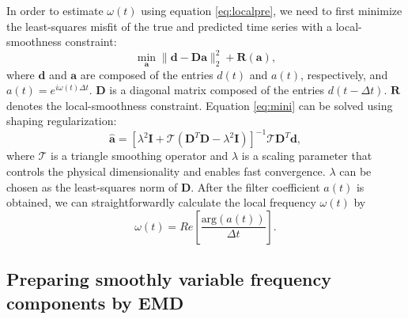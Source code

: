 In order to estimate $\omega(t)$ using equation \ref{eq:localpre}, we need to first minimize the least-squares misfit of the true and predicted time series with a local-smoothness constraint:
\begin{equation}
\label{eq:mini}
\min_{\mathbf{a}} \parallel \mathbf{d} - \mathbf{D} \mathbf{a} \parallel_2^2 + \mathbf{R}(\mathbf{a}),
\end{equation}
where $\mathbf{d}$ and $\mathbf{a}$ are  composed of the entries $d(t)$ and $a(t)$, respectively, and $a(t)=e^{i\omega(t)\Delta t}$. $\mathbf{D}$ is a diagonal matrix composed of the entries $d(t-\Delta t)$. $\mathbf{R}$ denotes the local-smoothness constraint. Equation \ref{eq:mini} can be solved using shaping regularization:
\begin{equation}
\hat{\mathbf{a}} = [\lambda^2\mathbf{I}+\mathcal{T}(\mathbf{D}^T\mathbf{D}-\lambda^2\mathbf{I})]^{-1}\mathcal{T}\mathbf{D}^T\mathbf{d},
\end{equation}
where $\mathcal{T}$ is a triangle smoothing operator and $\lambda$ is a scaling parameter that controls the physical dimensionality and enables fast convergence. $\lambda$ can be chosen as the least-squares norm of $\mathbf{D}$. After the filter coefficient $a(t)$ is obtained, we can straightforwardly calculate the local  frequency $\omega(t)$ by
\begin{equation}
\label{eq:circ}
\omega(t) = Re\left[\frac{\mbox{arg}(a(t))}{\Delta t}\right].
\end{equation}

\subsection{Preparing smoothly variable frequency components by EMD}



